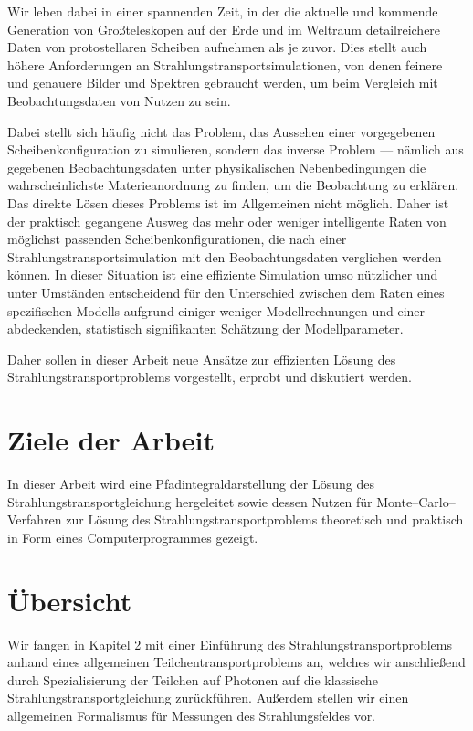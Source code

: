 	Wir leben dabei in einer spannenden Zeit, in der die aktuelle und kommende Generation von Großteleskopen auf der Erde und im Weltraum detailreichere Daten von protostellaren Scheiben aufnehmen als je zuvor. Dies stellt auch höhere Anforderungen an Strahlungstransportsimulationen, von denen feinere und genauere Bilder und Spektren gebraucht werden, um beim Vergleich mit Beobachtungsdaten von Nutzen zu sein.
	
	Dabei stellt sich häufig nicht das Problem, das Aussehen einer vorgegebenen Scheibenkonfiguration zu simulieren, sondern das inverse Problem --- nämlich aus gegebenen Beobachtungsdaten unter physikalischen Nebenbedingungen die wahrscheinlichste Materieanordnung zu finden, um die Beobachtung zu erklären. Das direkte Lösen dieses Problems ist im Allgemeinen nicht möglich. Daher ist der praktisch gegangene Ausweg das mehr oder weniger intelligente Raten von möglichst passenden Scheibenkonfigurationen, die nach einer Strahlungstransportsimulation mit den Beobachtungsdaten verglichen werden können. In dieser Situation ist eine effiziente Simulation umso nützlicher und unter Umständen entscheidend für den Unterschied zwischen dem Raten eines spezifischen Modells aufgrund einiger weniger Modellrechnungen und einer abdeckenden, statistisch signifikanten Schätzung der Modellparameter.
	
	Daher sollen in dieser Arbeit neue Ansätze zur effizienten Lösung des Strahlungstransportproblems vorgestellt, erprobt und diskutiert werden.
	
	\section{Ziele der Arbeit}
	In dieser Arbeit wird eine Pfadintegraldarstellung der Lösung des Strahlungstransportgleichung hergeleitet sowie dessen Nutzen für Monte--Carlo--Verfahren zur Lösung des Strahlungstransportproblems theoretisch und praktisch in Form eines Computerprogrammes gezeigt.
	
	\section{Übersicht}
	Wir fangen in Kapitel 2 mit einer Einführung des Strahlungstransportproblems anhand eines allgemeinen Teilchentransportproblems an, welches wir anschließend durch Spezialisierung der Teilchen auf Photonen auf die klassische Strahlungstransportgleichung zurückführen. Außerdem stellen wir einen allgemeinen Formalismus für Messungen des Strahlungsfeldes vor.
	

